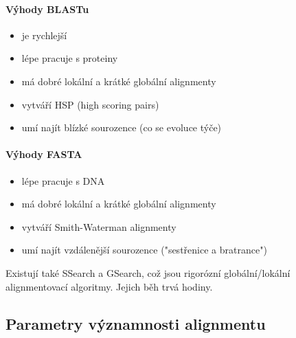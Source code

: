 \documentclass[DIV=8]{scrreprt}
\begin{document}
\paragraph{Výhody BLASTu}
\begin{itemize}[nosep]
    \item je rychlejší
    \item lépe pracuje s proteiny
    \item má dobré lokální a krátké globální alignmenty
    \item vytváří HSP (high scoring pairs)
    \item umí najít blízké sourozence (co se evoluce týče)
\end{itemize}



\paragraph{Výhody FASTA}
\begin{itemize}[nosep]
    \item lépe pracuje s DNA
    \item má dobré lokální a krátké globální alignmenty
    \item vytváří Smith-Waterman alignmenty
    \item umí najít vzdálenější sourozence ("sestřenice a bratrance")
\end{itemize}



Existují také SSearch a GSearch, což jsou rigorózní globální/lokální alignmentovací algoritmy. Jejich běh trvá hodiny.

\subsection{Parametry významnosti alignmentu} \label{Parametry významnosti alignmentu}
\end{document}
